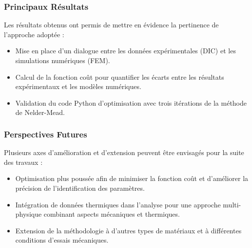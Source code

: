\documentclass[12pt,a4paper]{article}
\begin{document}
\subsubsection{Principaux Résultats}
Les résultats obtenus ont permis de mettre en évidence la pertinence de l'approche adoptée :

\begin{itemize}
    \item Mise en place d'un dialogue entre les données expérimentales (DIC) et les simulations numériques (FEM).
    \item Calcul de la fonction coût pour quantifier les écarts entre les résultats expérimentaux et les modèles numériques.
    \item Validation du code Python d'optimisation avec trois itérations de la méthode de Nelder-Mead.
\end{itemize}

\subsubsection{Perspectives Futures}
Plusieurs axes d'amélioration et d'extension peuvent être envisagés pour la suite des travaux :

\begin{itemize}
    \item Optimisation plus poussée afin de minimiser la fonction coût et d'améliorer la précision de l'identification des paramètres.
    \item Intégration de données thermiques dans l’analyse pour une approche multi-physique combinant aspects mécaniques et thermiques.
    \item Extension de la méthodologie à d'autres types de matériaux et à différentes conditions d’essais mécaniques.
\end{itemize}
\end{document}
